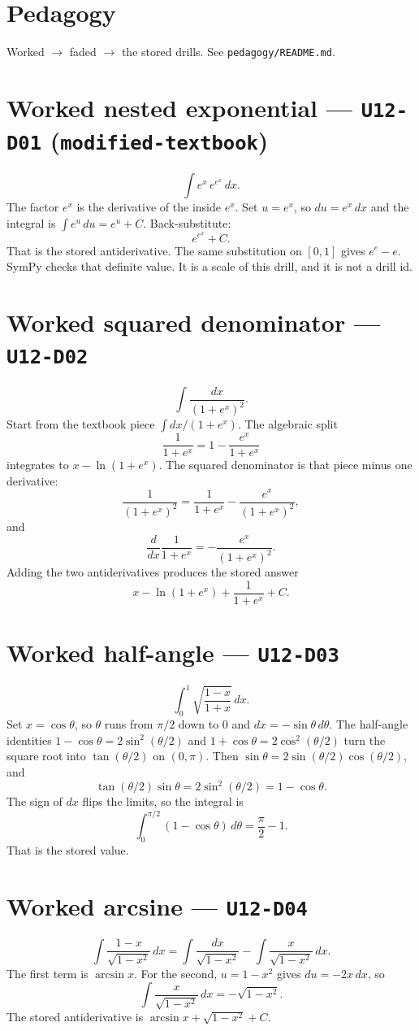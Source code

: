 \section{Pedagogy}
Worked $\to$ faded $\to$ the stored drills. See \texttt{pedagogy/README.md}.

\section{Worked nested exponential --- \texttt{U12-D01} (\texttt{modified-textbook})}
\[
\int e^{x}\,e^{e^{x}}\,dx.
\]
The factor $e^{x}$ is the derivative of the inside $e^{x}$. Set $u=e^{x}$, so $du=e^{x}\,dx$ and the integral is $\int e^{u}\,du=e^{u}+C$. Back-substitute:
\[
e^{e^{x}}+C.
\]
That is the stored antiderivative. The same substitution on $[0,1]$ gives $e^{e}-e$. SymPy checks that definite value. It is a scale of this drill, and it is not a drill id.

\section{Worked squared denominator --- \texttt{U12-D02}}
\[
\int\frac{dx}{(1+e^{x})^{2}}.
\]
Start from the textbook piece $\int dx/(1+e^{x})$. The algebraic split
\[
\frac{1}{1+e^{x}}=1-\frac{e^{x}}{1+e^{x}}
\]
integrates to $x-\ln(1+e^{x})$. The squared denominator is that piece minus one derivative:
\[
\frac{1}{(1+e^{x})^{2}}=\frac{1}{1+e^{x}}-\frac{e^{x}}{(1+e^{x})^{2}},
\]
and
\[
\frac{d}{dx}\frac{1}{1+e^{x}}=-\frac{e^{x}}{(1+e^{x})^{2}}.
\]
Adding the two antiderivatives produces the stored answer
\[
x-\ln(1+e^{x})+\frac{1}{1+e^{x}}+C.
\]

\section{Worked half-angle --- \texttt{U12-D03}}
\[
\int_{0}^{1}\sqrt{\frac{1-x}{1+x}}\,dx.
\]
Set $x=\cos\theta$, so $\theta$ runs from $\pi/2$ down to $0$ and $dx=-\sin\theta\,d\theta$. The half-angle identities $1-\cos\theta=2\sin^{2}(\theta/2)$ and $1+\cos\theta=2\cos^{2}(\theta/2)$ turn the square root into $\tan(\theta/2)$ on $(0,\pi)$. Then $\sin\theta=2\sin(\theta/2)\cos(\theta/2)$, and
\[
\tan(\theta/2)\sin\theta=2\sin^{2}(\theta/2)=1-\cos\theta.
\]
The sign of $dx$ flips the limits, so the integral is
\[
\int_{0}^{\pi/2}(1-\cos\theta)\,d\theta=\frac\pi2-1.
\]
That is the stored value.

\section{Worked arcsine --- \texttt{U12-D04}}
\[
\int\frac{1-x}{\sqrt{1-x^{2}}}\,dx=\int\frac{dx}{\sqrt{1-x^{2}}}-\int\frac{x}{\sqrt{1-x^{2}}}\,dx.
\]
The first term is $\arcsin x$. For the second, $u=1-x^{2}$ gives $du=-2x\,dx$, so
\[
\int\frac{x}{\sqrt{1-x^{2}}}\,dx=-\sqrt{1-x^{2}}.
\]
The stored antiderivative is $\arcsin x+\sqrt{1-x^{2}}+C$.

